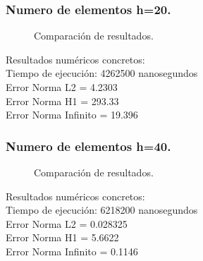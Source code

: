 \documentclass[12pt]{article}
\begin{document}
\subsubsection{Numero de elementos h=20.}
\begin{figure}[H]
    \centering
    \begin{subfigure}{0.32\textwidth}
        
    \end{subfigure}
    \hfill
    \begin{subfigure}{0.32\textwidth}
        
    \end{subfigure}
    \hfill
    \begin{subfigure}{0.32\textwidth}
        
    \end{subfigure}
    \caption{Comparación de resultados.}
    \label{fig:tresgraficas}
\end{figure}
Resultados numéricos concretos:\\
Tiempo de ejecución: 4262500 nanosegundos\\
Error Norma L2 = 4.2303\\
Error Norma H1 = 293.33\\
Error Norma Infinito = 19.396\\
\subsubsection{Numero de elementos h=40.}
\begin{figure}[H]
    \centering
    \begin{subfigure}{0.32\textwidth}
        
    \end{subfigure}
    \hfill
    \begin{subfigure}{0.32\textwidth}
        
    \end{subfigure}
    \hfill
    \begin{subfigure}{0.32\textwidth}
        
    \end{subfigure}
    \caption{Comparación de resultados.}
    \label{fig:tresgraficas}
\end{figure}
Resultados numéricos concretos:\\
Tiempo de ejecución: 6218200 nanosegundos\\
Error Norma L2 = 0.028325\\
Error Norma H1 = 5.6622\\
Error Norma Infinito = 0.1146\\
\end{document}
